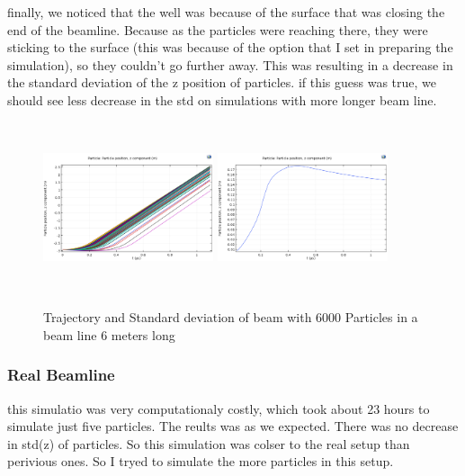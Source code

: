 \documentclass[12pt,a4paper]{article}
\begin{document}
 finally, we noticed that the well was because of the surface that was closing the end of the beamline. Because as the particles were reaching there, they were sticking to the surface (this was because of the option that I set in preparing the simulation), so they couldn't go further away. This was resulting in a decrease in the standard deviation of the z position of particles. if this guess was true, we should see less decrease in the std on simulations with more longer beam line.
 
\begin{figure}[h]
\centering
\includegraphics[width=50mm, height=50mm]{sim-in-100-long}
\includegraphics[width=50mm, height=50mm]{sim-std-100-long}
\caption{Trajectory and Standard deviation of beam with 6000 Particles in a beam line 6 meters long }
\end{figure}

\newpage
 
\subsubsection{Real Beamline}
this simulatio was very computationaly costly, which took about 23 hours to simulate just five particles. The reults was as we expected. There was no decrease in std(z) of particles. So this simulation was colser to the real setup than perivious ones. So I tryed to simulate the more particles in this setup.
\end{document}
